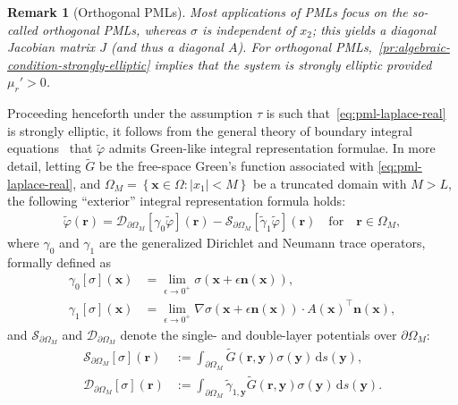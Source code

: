 \documentclass[11pt]{article}
\newcommand{\bn}{\mathbf{n}}
\newcommand{\bx}{\mathbf{x}}
\newcommand{\by}{\mathbf{y}}
\newcommand{\br}{\boldsymbol{r}}
\newcommand{\de}{\,\mathrm{d}}
\newcommand{\tvarphi}{\tilde \varphi}
\newtheorem{remark}[theorem]{Remark}
\begin{document}
\begin{remark}[Orthogonal PMLs]
  Most applications of PMLs focus on the so-called orthogonal PMLs, whereas
  $\sigma$ is independent of $x_2$; this yields a \emph{diagonal} Jacobian
  matrix $J$ (and thus a diagonal $A$). For orthogonal
  PMLs,~\cref{pr:algebraic-condition-strongly-elliptic} implies that the system
  is strongly elliptic provided $\mu_r' > 0$. 
\end{remark}  

Proceeding henceforth under the assumption $\tau$ is such
that~\cref{eq:pml-laplace-real} is strongly elliptic, it follows from the
general theory of boundary integral equations~\cite{mclean2000strongly} that
$\tvarphi$ admits Green-like integral representation formulae. In more detail,
letting $\tilde{G}$ be the free-space Green's function associated with
\cref{eq:pml-laplace-real}, and $\Omega_M = \left\{\bx \in \Omega : |x_1| <  M
\right\}$ be a truncated domain with $M>L$, the following ``exterior'' integral
representation formula holds:
\begin{align}
  \label{eq:greens-representation-bounded}
  \tvarphi(\br) = \mathcal{D}_{\partial \Omega_M}[\gamma_0\tvarphi](\br) - \mathcal{S}_{\partial \Omega_M}[\tilde{\gamma}_1 {\tvarphi}](\br) \quad \mbox{for} \quad \br \in \Omega_M,
\end{align}
where $\gamma_0$ and $\gamma_1$ are the generalized Dirichlet and Neumann trace
operators, formally defined as 
\begin{subequations}
\label{eq:traces}  
\begin{align}
  \label{eq:dir-trace}
  \gamma_0[\sigma](\bx) &= \lim_{\epsilon \to 0^+} \sigma(\bx + \epsilon \bn(\bx)),\\
  \label{eq:neu-trace}
  \gamma_1[\sigma](\bx) &= \lim_{\epsilon \to 0^+} \nabla \sigma(\bx + \epsilon \bn(\bx)) \cdot A(\bx)^\top \bn(\bx),
\end{align}
\end{subequations}
and $\mathcal{S}_{\partial \Omega_M}$ and $\mathcal{D}_{\partial \Omega_M}$ denote the single- and
double-layer potentials over $\partial \Omega_M$:
\begin{subequations}\label{eq:potentials}
  \begin{align}
    \label{eq:SL-potential}  
    \mathcal{S}_{\partial \Omega_M}[\sigma](\br) &:= \int_{\partial \Omega_M} {\tilde{G}}(\br, \by)\sigma(\by) \de s(\by), \\
    \label{eq:DL-potential}  
    \mathcal{D}_{\partial \Omega_M}[\sigma](\br) &:= \int_{\partial \Omega_M} \tilde{\gamma}_{1,\by}{\tilde{G}}(\br, \by) \sigma(\by) \de s(\by).
  \end{align}
\end{subequations}
\end{document}
